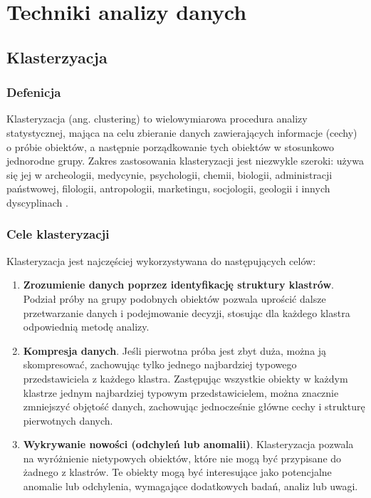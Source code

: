 \chapter{Techniki analizy danych}

\section{Klasterzyacja}

	\subsection{Defenicja}
		Klasteryzacja (ang. clustering) to wielowymiarowa procedura analizy statystycznej, mająca na celu zbieranie danych zawierających informacje (cechy) o próbie obiektów, a następnie porządkowanie tych obiektów w stosunkowo jednorodne grupy. Zakres zastosowania klasteryzacji jest niezwykle szeroki: używa się jej w archeologii, medycynie, psychologii, chemii, biologii, administracji państwowej, filologii, antropologii, marketingu, socjologii, geologii i innych dyscyplinach \cite{Clustering}. 
	
	\subsection{Cele klasteryzacji}
		Klasteryzacja jest najczęściej wykorzystywana do następujących celów:
		\begin{enumerate}
			\item \textbf{Zrozumienie danych poprzez identyfikację struktury klastrów}. Podział próby na grupy podobnych obiektów pozwala uprościć dalsze przetwarzanie danych i podejmowanie decyzji, stosując dla każdego klastra odpowiednią metodę analizy.
			\item \textbf{Kompresja danych}. Jeśli pierwotna próba jest zbyt duża, można ją skompresować, zachowując tylko jednego najbardziej typowego przedstawiciela z każdego klastra. Zastępując wszystkie obiekty w każdym klastrze jednym najbardziej typowym przedstawicielem, można znacznie zmniejszyć objętość danych, zachowując jednocześnie główne cechy i strukturę pierwotnych danych.
			\item \textbf{Wykrywanie nowości (odchyleń lub anomalii)}. Klasteryzacja pozwala na wyróżnienie nietypowych obiektów, które nie mogą być przypisane do żadnego z klastrów. Te obiekty mogą być interesujące jako potencjalne anomalie lub odchylenia, wymagające dodatkowych badań, analiz lub uwagi.
		\end{enumerate}
	
